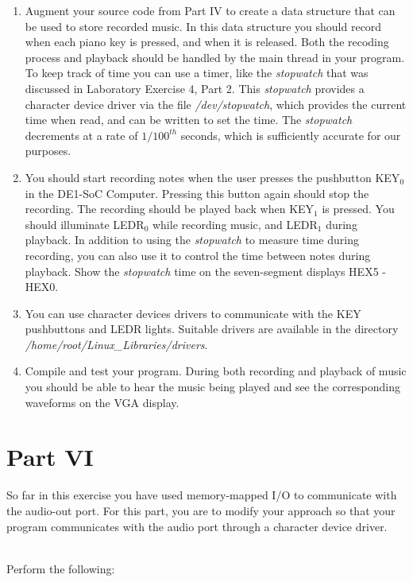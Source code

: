 \documentclass[epsfig,10pt,fullpage]{article}
\begin{document}
\begin{enumerate}
\item Augment your source code from Part IV to create a data structure that can be used to
store recorded music. In this data structure you should record when each piano key is
pressed, and when it is released. Both the recoding process and playback should be handled
by the main thread in your program. To keep track of time you can use a timer, like the
{\it stopwatch} that was discussed in Laboratory Exercise 4, Part 2. This {\it stopwatch}
provides a character device driver via the file {\it /dev/stopwatch}, which provides the current
time when read, and can be written to set the time. The {\it stopwatch} decrements at a
rate of $1/100^{th}$ seconds, which is sufficiently accurate for our purposes.
\item You should start recording notes when the user presses the pushbutton KEY$_0$ in the
DE1-SoC Computer. Pressing this button again should stop the recording. The recording should be
played back when KEY$_1$ is pressed. You should illuminate LEDR$_0$ while recording
music, and LEDR$_1$ during playback. In addition to using the {\it stopwatch} to measure
time during recording, you can also use it to control the time between notes during
playback. Show the {\it stopwatch} time on the seven-segment displays HEX5 - HEX0.
\item You can use character devices drivers to communicate with the KEY pushbuttons and LEDR
lights. Suitable drivers are available in the directory
{\it /home/root/Linux\_Libraries/drivers}.
\item Compile and test your program. During both recording and playback of music you
should be able to hear the music being played and see the corresponding waveforms on the
VGA display.
\end{enumerate}

\newpage
\noindent
\section*{Part VI}

\noindent
So far in this exercise you have used memory-mapped I/O to communicate with the audio-out
port. For this part, you are to modify your approach so that your program communicates with
the audio port through a character device driver.

~\\
\noindent
Perform the following:
\end{document}
